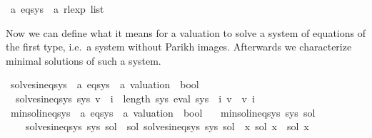 \begin{isabellebody}
\begin{isamarkuptext}
\end{isamarkuptext}\isamarkuptrue%
\isamarkupfalse%
\ {\isacharprime}{\kern0pt}a\ eq{\isacharunderscore}{\kern0pt}sys\ {\isacharequal}{\kern0pt}\ {\isachardoublequoteopen}{\isacharprime}{\kern0pt}a\ rlexp\ list{\isachardoublequoteclose}%
\begin{isamarkuptext}%
Now we can define what it means for a valuation  to solve a system of equations of the
first type, i.e.\ a system without Parikh images. Afterwards we characterize minimal solutions of
such a system.%
\end{isamarkuptext}\isamarkuptrue%
\isamarkupfalse%
\ solves{\isacharunderscore}{\kern0pt}ineq{\isacharunderscore}{\kern0pt}sys\ {\isacharcolon}{\kern0pt}{\isacharcolon}{\kern0pt}\ {\isachardoublequoteopen}{\isacharprime}{\kern0pt}a\ eq{\isacharunderscore}{\kern0pt}sys\ {\isasymRightarrow}\ {\isacharprime}{\kern0pt}a\ valuation\ {\isasymRightarrow}\ bool{\isachardoublequoteclose}\ \isanewline
\ \ {\isachardoublequoteopen}solves{\isacharunderscore}{\kern0pt}ineq{\isacharunderscore}{\kern0pt}sys\ sys\ v\ {\isasymequiv}\ {\isasymforall}i\ {\isacharless}{\kern0pt}\ length\ sys{\isachardot}{\kern0pt}\ eval\ {\isacharparenleft}{\kern0pt}sys\ {\isacharbang}{\kern0pt}\ i{\isacharparenright}{\kern0pt}\ v\ {\isasymsubseteq}\ v\ i{\isachardoublequoteclose}\isanewline
\isanewline
{}\isamarkupfalse%
\ min{\isacharunderscore}{\kern0pt}sol{\isacharunderscore}{\kern0pt}ineq{\isacharunderscore}{\kern0pt}sys\ {\isacharcolon}{\kern0pt}{\isacharcolon}{\kern0pt}\ {\isachardoublequoteopen}{\isacharprime}{\kern0pt}a\ eq{\isacharunderscore}{\kern0pt}sys\ {\isasymRightarrow}\ {\isacharprime}{\kern0pt}a\ valuation\ {\isasymRightarrow}\ bool{\isachardoublequoteclose}\ \isanewline
\ \ {\isachardoublequoteopen}min{\isacharunderscore}{\kern0pt}sol{\isacharunderscore}{\kern0pt}ineq{\isacharunderscore}{\kern0pt}sys\ sys\ sol\ {\isasymequiv}\isanewline
\ \ \ \ solves{\isacharunderscore}{\kern0pt}ineq{\isacharunderscore}{\kern0pt}sys\ sys\ sol\ {\isasymand}\ {\isacharparenleft}{\kern0pt}{\isasymforall}sol{\isacharprime}{\kern0pt}{\isachardot}{\kern0pt}\ solves{\isacharunderscore}{\kern0pt}ineq{\isacharunderscore}{\kern0pt}sys\ sys\ sol{\isacharprime}{\kern0pt}\ {\isasymlongrightarrow}\ {\isacharparenleft}{\kern0pt}{\isasymforall}x{\isachardot}{\kern0pt}\ sol\ x\ {\isasymsubseteq}\ sol{\isacharprime}{\kern0pt}\ x{\isacharparenright}{\kern0pt}{\isacharparenright}{\kern0pt}{\isachardoublequoteclose}%

\end{isabellebody}
